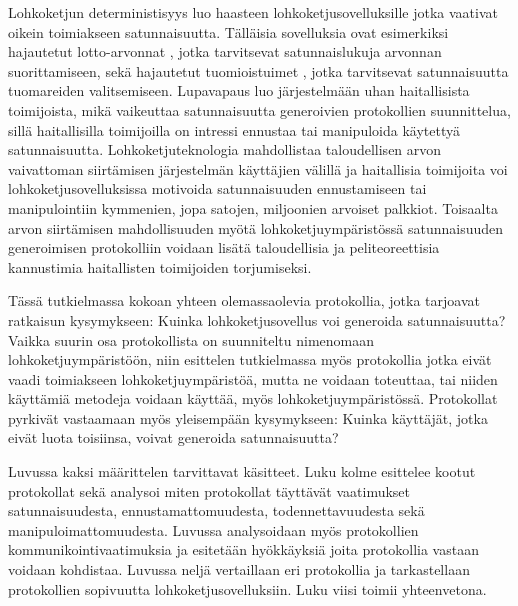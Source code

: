 Lohkoketjun deterministisyys luo haasteen lohkoketjusovelluksille jotka vaativat oikein toimiakseen satunnaisuutta. Tälläisia sovelluksia ovat esimerkiksi hajautetut lotto-arvonnat \cite{pooltogether_pooltogether_nodate}, jotka tarvitsevat satunnaislukuja arvonnan suorittamiseen, sekä hajautetut tuomioistuimet \cite{lesaege_kleros_2020}, jotka tarvitsevat satunnaisuutta tuomareiden valitsemiseen. Lupavapaus luo järjestelmään uhan haitallisista toimijoista, mikä vaikeuttaa satunnaisuutta generoivien protokollien suunnittelua, sillä haitallisilla toimijoilla on intressi ennustaa tai manipuloida käytettyä satunnaisuutta. Lohkoketjuteknologia mahdollistaa taloudellisen arvon vaivattoman siirtämisen järjestelmän käyttäjien välillä ja haitallisia toimijoita voi lohkoketjusovelluksissa motivoida satunnaisuuden ennustamiseen tai manipulointiin kymmenien, jopa satojen, miljoonien arvoiset palkkiot. Toisaalta arvon siirtämisen mahdollisuuden myötä lohkoketjuympäristössä satunnaisuuden generoimisen protokolliin voidaan lisätä taloudellisia ja peliteoreettisia kannustimia haitallisten toimijoiden torjumiseksi.

Tässä tutkielmassa kokoan yhteen olemassaolevia protokollia, jotka tarjoavat ratkaisun kysymykseen: Kuinka lohkoketjusovellus voi generoida satunnaisuutta?
Vaikka suurin osa protokollista on suunniteltu nimenomaan lohkoketjuympäristöön, niin esittelen tutkielmassa myös protokollia jotka eivät vaadi toimiakseen lohkoketjuympäristöä, mutta ne voidaan toteuttaa, tai niiden käyttämiä metodeja voidaan käyttää, myös lohkoketjuympäristössä. Protokollat pyrkivät vastaamaan myös yleisempään kysymykseen: Kuinka käyttäjät, jotka eivät luota toisiinsa, voivat generoida satunnaisuutta?

Luvussa kaksi määrittelen tarvittavat käsitteet. Luku kolme esittelee kootut protokollat sekä analysoi miten protokollat täyttävät vaatimukset satunnaisuudesta, ennustamattomuudesta, todennettavuudesta sekä manipuloimattomuudesta. Luvussa analysoidaan myös protokollien kommunikointivaatimuksia ja esitetään hyökkäyksiä joita protokollia vastaan voidaan kohdistaa. Luvussa neljä vertaillaan eri protokollia ja tarkastellaan protokollien sopivuutta lohkoketjusovelluksiin. Luku viisi toimii yhteenvetona.